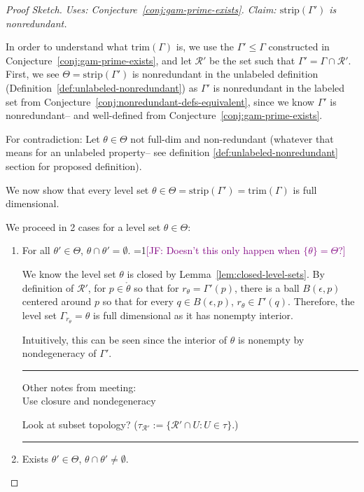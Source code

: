 \documentclass[12pt]{article}
\newcommand{\Comments}{1}
\newcommand{\mynote}[2]{\ifnum\Comments=1\textcolor{#1}{#2}\fi}
\newcommand{\jessie}[1]{\mynote{purple}{[JF: #1]}}
\newcommand{\R}{\mathcal{R}}
\newcommand{\inter}[1]{\mathring{#1}}%
\newcommand{\trim}{\mathrm{trim}}
\newcommand{\strip}{\mathrm{strip}}
\begin{document}
\begin{proof}[Proof Sketch]
	\emph{Uses: Conjecture~\ref{conj:gam-prime-exists}.  Claim: $\strip(\Gamma')$ is nonredundant.}
	
	In order to understand what $\trim(\Gamma)$ is, we use the $\Gamma' \leq \Gamma$ constructed in Conjecture~\ref{conj:gam-prime-exists}, and let $\R'$ be the set such that $\Gamma' = \Gamma\cap \R'$.
	First, we see $\Theta = \strip(\Gamma')$ is nonredundant in the unlabeled definition (Definition~\ref{def:unlabeled-nonredundant}) as $\Gamma'$ is nonredundant in the labeled set from Conjecture~\ref{conj:nonredundant-defs-equivalent}, since we know $\Gamma'$ is nonredundant-- and well-defined from Conjecture~\ref{conj:gam-prime-exists}.
	
	
	
	For contradiction:
	Let $\theta \in \Theta$ not full-dim and non-redundant (whatever that means for an unlabeled property-- see definition \ref{def:unlabeled-nonredundant} section for proposed definition).
	
	We now show that every level set $\theta \in \Theta = \strip(\Gamma') = \trim(\Gamma)$ is full dimensional.
	
	We proceed in 2 cases for a level set $\theta \in \Theta$:
	\begin{enumerate}
		\item For all $\theta' \in \Theta$, $\theta \cap \theta' = \emptyset$.
		\jessie{Doesn't this only happen when $\{\theta\} = \Theta$?}
		
		We know the level set $\theta$ is closed by Lemma~\ref{lem:closed-level-sets}.
		By definition of $\R'$, for $p \in \inter{\theta}$ so that for $r_\theta = \Gamma'(p)$, there is a ball $B(\epsilon, p)$ centered around $p$ so that for every $q \in B(\epsilon, p)$, $r_\theta \in \Gamma'(q)$.
		Therefore, the level set $\Gamma_{r_\theta} = \theta$ is full dimensional as it has nonempty interior.
		
		Intuitively, this can be seen since the interior of $\theta$ is nonempty by nondegeneracy of $\Gamma'$.
		
		\bigskip
		\hrule
		Other notes from meeting:\\
		Use closure and nondegeneracy
		
		Look at subset topology? ($\tau_{\R'} := \{\R' \cap U : U \in \tau \}$.)
		
		\hrule
		\item Exists $\theta' \in \Theta$, $\theta \cap \theta' \neq \emptyset$.
		

\end{enumerate}
\end{proof}
\end{document}
